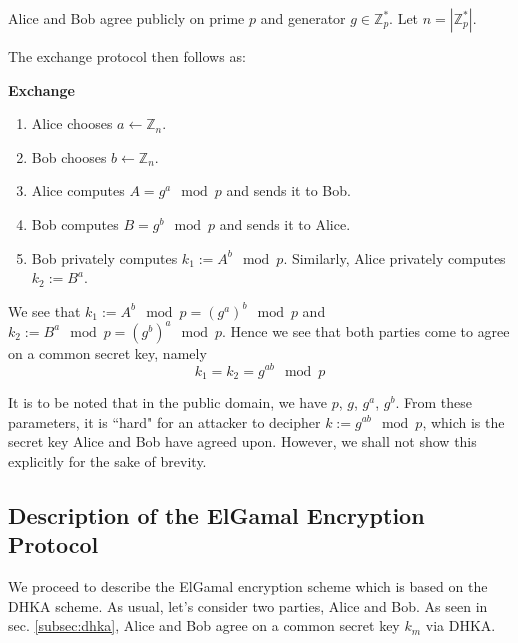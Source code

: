 Alice and Bob agree publicly on prime \( p \) and generator \( g \in \mathbb{Z}^*_p \). 
Let \( n = |\mathbb{Z}^*_p| \).

The exchange protocol then follows as:

\begin{tcolorbox}
\textbf{Exchange} 
\begin{enumerate}
    \item Alice chooses \( a \leftarrow \mathbb{Z}_n \). 
    \item Bob chooses \( b \leftarrow \mathbb{Z}_n \).
    \item Alice computes \( A = g^a \mod p \) and sends it to Bob.
    \item Bob computes \( B = g^b \mod p \) and sends it to Alice.
    \item Bob privately computes \( k_1 := A^b \mod p \). Similarly, Alice privately computes \( k_2 := B^a \).
\end{enumerate}
\end{tcolorbox}

We see that \( k_1 := A^b \mod p = (g^a)^b \mod p \) and \( k_2 := B^a \mod p = (g^b)^a \mod p \). Hence we see that both parties come to agree on a common secret key, namely
\begin{equation}
    k_1 = k_2 = g^{ab} \mod p
\end{equation}

It is to be noted that in the public domain, we have \( p \), \( g \), \( g^a \), \( g^b \). 
From these parameters, it is ``hard" for an attacker to decipher \( k := g^{ab} \mod p\), which is the secret key Alice and Bob have agreed upon. 
However, we shall not show this explicitly for the sake of brevity.

\subsection{Description of the ElGamal Encryption Protocol}

We proceed to describe the ElGamal encryption scheme which is based on the DHKA scheme. As usual, let's consider two parties, Alice and Bob. 
As seen in sec. \ref{subsec:dhka}, Alice and Bob agree on a common secret key \( k_m \) via DHKA. 




\smallskip


